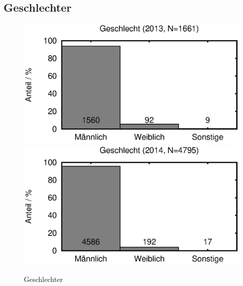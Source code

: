 \documentclass[11pt]{scrartcl}
\begin{document}
\subsection{Geschlechter}

\begin{figure}[htbp]
	\centering
	\includegraphics[width=0.48\linewidth]{2013/geschlecht-rel}\hfill
	\includegraphics[width=0.48\linewidth]{2014/geschlecht-rel}
	\caption{Geschlechter}
	\label{fig:geschlecht}
\end{figure}

\clearpage
{}

\end{document}
